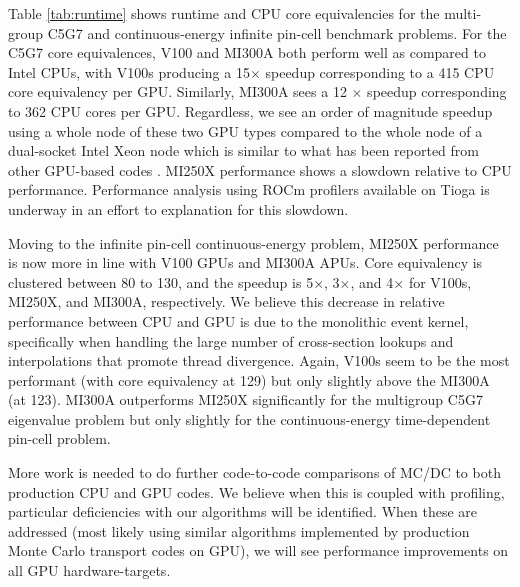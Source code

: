 Table \ref{tab:runtime} shows runtime and CPU core equivalencies for the multi-group C5G7 and continuous-energy infinite pin-cell benchmark problems.
For the C5G7 core equivalences, V100 and MI300A both perform well as compared to Intel CPUs, with V100s producing a 15$\times$ speedup corresponding to a 415 CPU core equivalency per GPU.
Similarly, MI300A sees a 12 $\times$ speedup corresponding to 362 CPU cores per GPU.
Regardless, we see an order of magnitude speedup using a whole node of these two GPU types compared to the whole node of a dual-socket Intel Xeon node which is similar to what has been reported from other GPU-based codes \cite{tramm2024performanceportablemontecarlo, mcsummit}.
MI250X performance shows a slowdown relative to CPU performance.
Performance analysis using ROCm profilers available on Tioga is underway in an effort to explanation for this slowdown.

Moving to the infinite pin-cell continuous-energy problem, MI250X performance is now more in line with V100 GPUs and MI300A APUs. Core equivalency is clustered between 80 to 130, and the speedup is 5$\times$, 3$\times$, and 4$\times$ for V100s, MI250X, and MI300A, respectively. 
We believe this decrease in relative performance between CPU and GPU is due to the monolithic event kernel, specifically when handling the large number of cross-section lookups and interpolations that promote thread divergence.
Again, V100s seem to be the most performant (with core equivalency at 129) but only slightly above the MI300A (at 123).
MI300A outperforms MI250X significantly for the multigroup C5G7 eigenvalue problem but only slightly for the continuous-energy time-dependent pin-cell problem. 

More work is needed to do further code-to-code comparisons of MC/DC to both production CPU and GPU codes.
We believe when this is coupled with profiling, particular deficiencies with our algorithms will be identified.
When these are addressed (most likely using similar algorithms implemented by production Monte Carlo transport codes on GPU), we will see performance improvements on all GPU hardware-targets.

